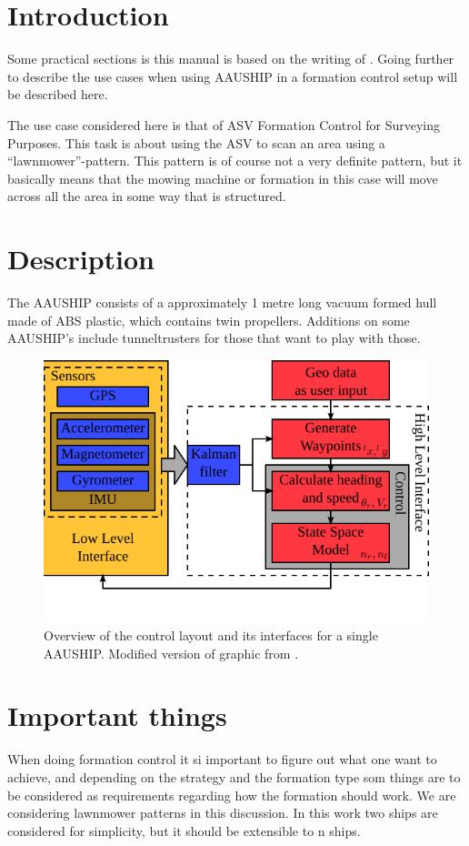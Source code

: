 \section{Introduction}

Some practical sections is this manual is based on the writing of
\cite{12gr730}. Going further to describe the use cases when using
AAUSHIP in a formation control setup will be described here.

The use case considered here is that of \ac{ASV} Formation Control for
Surveying Purposes. This task is about using the \ac{ASV} to scan an
area using a ``lawnmower''-pattern. This pattern is of course not a
very definite pattern, but it basically means that the mowing machine
or formation in this case will move across all the area in some way
that is structured.

\section{Description} The AAUSHIP consists of a approximately 1 metre
long vacuum formed hull made of ABS plastic, which contains twin
propellers. Additions on some AAUSHIP's include tunneltrusters for
those that want to play with those.

\begin{figure}[htbp]
	\includegraphics[width=\textwidth]{fig/vessel-block-overview}
	\caption{Overview of the control layout and its interfaces for a
		single AAUSHIP.
		Modified version of graphic from \citep{12gr730}.}
	\label{fig:vessel-block-overview}
\end{figure}

\section{Important things}
When doing formation control it si important to figure out what one
want to achieve, and depending on the strategy and the formation type
som things are to be considered as requirements regarding how the
formation should work. We are considering lawnmower patterns in this
discussion. In this work two ships are considered for simplicity, but
it should be extensible to n ships.

